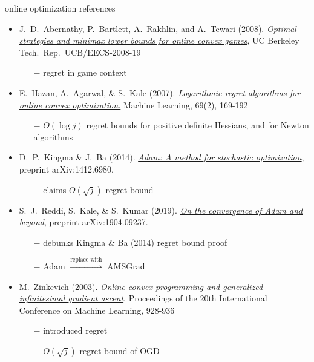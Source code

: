 \documentclass[svgnames,
               hyperref={colorlinks,citecolor=DeepPink4,linkcolor=FireBrick,urlcolor=Maroon},
               usepdftitle=false]  %
               {beamer}
\begin{document}
\begin{frame}{online optimization references}

\begin{itemize}
\footnotesize
\item J.~D.~Abernathy, P.~Bartlett, A.~Rakhlin, and A.~Tewari (2008). \href{https://www2.eecs.berkeley.edu/Pubs/TechRpts/2008/EECS-2008-19.pdf}{\emph{Optimal strategies and minimax lower bounds for online convex games}}, UC Berkeley Tech.~Rep.~UCB/EECS-2008-19
    \begin{itemize}
    \scriptsize
    \item[$-$] regret in game context
    \end{itemize}
\item E.~Hazan, A.~Agarwal, \& S.~Kale (2007).  \href{https://link.springer.com/content/pdf/10.1007/s10994-007-5016-8.pdf}{\emph{Logarithmic regret algorithms for online convex optimization.}} Machine Learning, 69(2), 169-192
    \begin{itemize}
    \scriptsize
    \item[$-$] $O(\log j)$ regret bounds for positive definite Hessians, and for Newton algorithms
    \end{itemize}
\item D.~P.~Kingma \& J.~Ba (2014). \href{https://arxiv.org/abs/1412.6980}{\emph{Adam: A method for stochastic optimization}}, preprint arXiv:1412.6980.
    \begin{itemize}
    \scriptsize
    \item[$-$] claims $O(\sqrt{j})$ regret bound
    \end{itemize}
\item S.~J.~Reddi, S.~Kale, \& S.~Kumar (2019). \href{https://arxiv.org/abs/1904.09237}{\emph{On the convergence of Adam and beyond}}, preprint arXiv:1904.09237.
    \begin{itemize}
    \scriptsize
    \item[$-$] debunks Kingma \& Ba (2014) regret bound proof
    \item[$-$] Adam $\stackrel{\text{replace with}}{\to}$ AMSGrad
    \end{itemize}
\item M.~Zinkevich (2003). \href{https://www.aaai.org/Papers/ICML/2003/ICML03-120.pdf}{\emph{Online convex programming and generalized infinitesimal gradient ascent}}, Proceedings of the 20th International Conference on Machine Learning, 928-936
    \begin{itemize}
    \scriptsize
    \item[$-$] introduced regret
    \item[$-$] $O(\sqrt{j})$ regret bound of OGD
    \end{itemize}
\end{itemize}
\end{frame}
\end{document}
